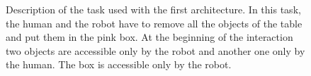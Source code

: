 \documentclass[english,a4paper,11pt,twoside]{StyleThese}
\begin{document}
\begin{figure}[!h]
\centering
	\hfill
    \caption{Description of the task used with the first architecture. In this task, the human and the robot have to remove all the objects of the table and put them in the pink box. At the beginning of the interaction two objects are accessible only by the robot and another one only by the human. The box is accessible only by the robot.}
    \label{fig:firstTask}
\end{figure}
\end{document}

